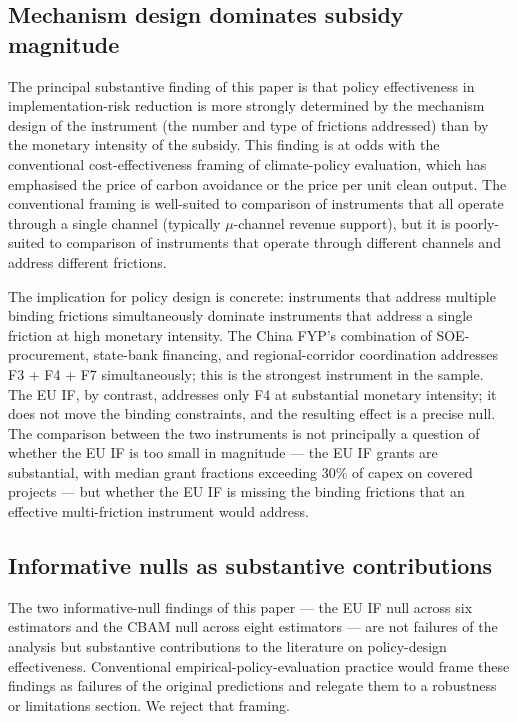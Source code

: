\documentclass[12pt,a4paper]{article}
\theoremstyle{plain}
\theoremstyle{definition}
\begin{document}
\subsection{Mechanism design dominates subsidy magnitude}
\label{sec:discussion-mechanism}

The principal substantive finding of this paper is that policy effectiveness in implementation-risk reduction is more strongly determined by the mechanism design of the instrument (the number and type of frictions addressed) than by the monetary intensity of the subsidy. This finding is at odds with the conventional cost-effectiveness framing of climate-policy evaluation, which has emphasised the price of carbon avoidance or the price per unit clean output. The conventional framing is well-suited to comparison of instruments that all operate through a single channel (typically $\mu$-channel revenue support), but it is poorly-suited to comparison of instruments that operate through different channels and address different frictions.

The implication for policy design is concrete: instruments that address multiple binding frictions simultaneously dominate instruments that address a single friction at high monetary intensity. The China FYP's combination of SOE-procurement, state-bank financing, and regional-corridor coordination addresses F3 + F4 + F7 simultaneously; this is the strongest instrument in the sample. The EU IF, by contrast, addresses only F4 at substantial monetary intensity; it does not move the binding constraints, and the resulting effect is a precise null. The comparison between the two instruments is not principally a question of whether the EU IF is too small in magnitude --- the EU IF grants are substantial, with median grant fractions exceeding 30\% of capex on covered projects --- but whether the EU IF is missing the binding frictions that an effective multi-friction instrument would address.

\subsection{Informative nulls as substantive contributions}
\label{sec:discussion-nulls}

The two informative-null findings of this paper --- the EU IF null across six estimators and the CBAM null across eight estimators --- are not failures of the analysis but substantive contributions to the literature on policy-design effectiveness. Conventional empirical-policy-evaluation practice would frame these findings as failures of the original predictions and relegate them to a robustness or limitations section. We reject that framing.
\end{document}
